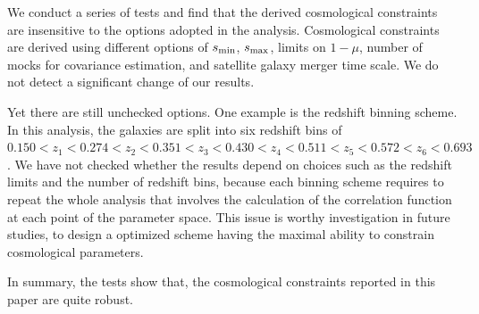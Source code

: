 \documentclass[iop]{emulateapj}
\begin{document}
We conduct a series of tests and find that the derived cosmological constraints are insensitive to the options adopted in the analysis.
Cosmological constraints are derived using different options of $s_{\rm min}$, $s_{\rm max}$, limits on $1-\mu$, number of mocks for covariance estimation,
and satellite galaxy merger time scale.
We do not detect a significant change of our results.



Yet there are still unchecked options. 
One example is the redshift binning scheme.
In this analysis, the galaxies are split into six redshift bins of
$0.150<z_1<0.274<z_2<0.351<z_3<0.430<z_4<0.511<z_5<0.572<z_6<0.693$.
We have not checked whether the results depend on choices such as the redshift limits and the number of redshift bins,
because each binning scheme requires to repeat the whole analysis that involves the calculation of the correlation function 
at each point of the parameter space.
This issue is worthy investigation in future studies, 
to design a optimized scheme having the maximal ability to constrain cosmological parameters.

In summary, the tests show that, the cosmological constraints reported in this paper are quite robust.

\end{document}
